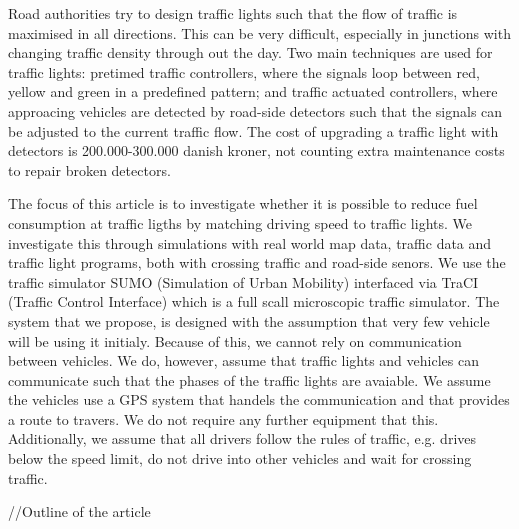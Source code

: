 Road authorities try to design traffic lights such that the flow of traffic is maximised in all directions.
This can be very difficult, especially in junctions with changing traffic density through out the day.
Two main techniques are used for traffic lights: pretimed traffic controllers, where the signals loop between red, yellow and green in a predefined pattern; and traffic actuated controllers, where approacing vehicles are detected by road-side detectors such that the signals can be adjusted to the current traffic flow. 
The cost of upgrading a traffic light with detectors is 200.000-300.000 danish kroner, not counting extra maintenance costs to repair broken detectors\cite{Vejdir}.

The focus of this article is to investigate whether it is possible to reduce fuel consumption at traffic ligths by matching driving speed to traffic lights. 
We investigate this through simulations with real world map data, traffic data and traffic light programs, both with crossing traffic and road-side senors. %
We use the traffic simulator SUMO (Simulation of Urban Mobility)\cite{sumo} interfaced via TraCI (Traffic Control Interface)\cite{traci} which is a full scall microscopic traffic simulator.
The system that we propose, is designed with the assumption that very few vehicle will be using it initialy. 
Because of this, we cannot rely on communication between vehicles.
We do, however, assume that traffic lights and vehicles can communicate such that the phases of the traffic lights are avaiable.
We assume the vehicles use a GPS system that handels the communication and that provides a route to travers.
We do not require any further equipment that this.
Additionally, we assume that all drivers follow the rules of traffic, e.g. drives below the speed limit, do not drive into other vehicles and wait for crossing traffic.

//Outline of the article












